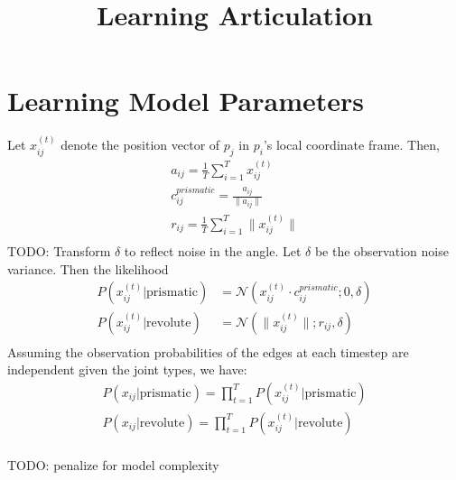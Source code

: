 \documentclass[english]{article}
\begin{document}

\date{}
\title{\textbf{Learning Articulation}}
\maketitle
\section*{Learning Model Parameters}
Let $x_{ij}^{(t)}$ denote the position vector of $p_j$ in $p_i$'s local coordinate frame. Then,
\begin{align*}
  a_{ij} = \frac{1}{T}\sum_{i=1}^T x_{ij}^{(t)}\\
  c_{ij}^{prismatic} = \frac{a_{ij}}{\|a_{ij}\|}\\
  r_{ij} = \frac{1}{T}\sum_{i=1}^T \|x_{ij}^{(t)}\|\\
\end{align*}
TODO: Transform $\delta$ to reflect noise in the angle.
Let $\delta$ be the observation noise variance. Then the likelihood
\begin{align*}
  P(x_{ij}^{(t)}|\text{prismatic}) &=  \mathcal{N}(x_{ij}^{(t)}\cdot c_{ij}^{prismatic};0, \delta)\\
   P(x_{ij}^{(t)}|\text{revolute}) &=  \mathcal{N}(\|x_{ij}^{(t)}\|; r_{ij}, \delta)\\
\end{align*}
Assuming the observation probabilities of the edges at each timestep are independent given the joint types, we have:
\begin{align*}
  P(x_{ij}|\text{prismatic}) = \prod_{t=1}^T P(x_{ij}^{(t)}|\text{prismatic})\\
  P(x_{ij}|\text{revolute}) = \prod_{t=1}^T P(x_{ij}^{(t)}|\text{revolute})\\
\end{align*}

TODO: penalize for model complexity

  
\end{document}
